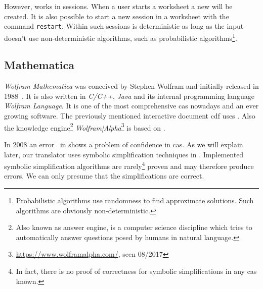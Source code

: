 However, \Maple{} works in sessions. When a user starts a worksheet a new  will be created. It is also possible to start a new session in a worksheet with the command \texttt{restart}. Within such sessions \Maple{} is deterministic as long as the input doesn't use non-deterministic algorithms, such as probabilistic algorithms\footnote{Probabilistic algorithms use randomness to find approximate solutions. Such algorithms are obviously non-deterministic.}.

\subsection{Mathematica}\label{subsec:mathematica}
\textit{Wolfram Mathematica} was conceived by Stephen Wolfram and initially released in 1988~\cite{Mathematica}. It is also written in \textit{C/C++}, \textit{Java} and its internal programming language \textit{Wolfram Language}. It is one of the most comprehensive \gls{cas} nowadays and an ever growing software. The previously mentioned interactive document \gls{cdf} uses \Mathematica. Also the knowledge engine\footnote{Also known as answer engine, is a computer science discipline which tries to automatically answer questions posed by humans in natural language.} \textit{Wolfram|Alpha}\footnote{\url{https://www.wolframalpha.com/}, seen 08/2017} is based on \Mathematica.

In 2008 an error~\cite{Mathematica:Bug} in \Mathematica{} shows a problem of confidence in \gls{cas}. As we will explain later, our translator uses symbolic simplification\cite[section 2]{ComputerAlgebra} techniques in \Maple. Implemented symbolic simplification algorithms are rarely\footnote{In fact, there is no proof of correctness for symbolic simplifications in any \gls{cas} known.} proven and may therefore produce errors. We can only presume that the simplifications are correct.